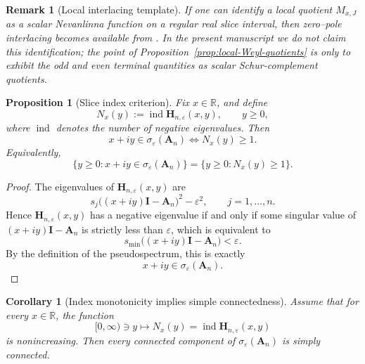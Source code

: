 \documentclass[11pt]{article}
\newtheorem{proposition}[theorem]{Proposition}
\newtheorem{corollary}[theorem]{Corollary}
\newtheorem{remark}[theorem]{Remark}
\DeclareMathOperator{\ind}{ind}
\begin{document}
\begin{remark}[Local interlacing template]\label{rem:BMT-template}
If one can identify a local quotient \(M_{x,J}\) as a scalar Nevanlinna function on a regular real
slice interval, then zero--pole interlacing becomes available from
\cite[Corollary~3.5]{BehrndtMowsTrunk2011}. In the present manuscript we do not claim this
identification; the point of Proposition~\ref{prop:local-Weyl-quotients} is only to exhibit the
odd and even terminal quantities as scalar Schur-complement quotients.
\end{remark}

\begin{proposition}[Slice index criterion]\label{prop:slice-index-criterion}
Fix \(x\in\mathbb R\), and define
\[
N_x(y):=\ind \mathbf{H}_{n,\varepsilon}(x,y),
\qquad y\ge 0,
\]
where \(\ind\) denotes the number of negative eigenvalues.
Then
\[
x+iy\in \sigma_\varepsilon(\mathbf A_n)
\iff
N_x(y)\ge 1.
\]
Equivalently,
\[
\{y\ge 0:x+iy\in \sigma_\varepsilon(\mathbf A_n)\}
=
\{y\ge 0:N_x(y)\ge 1\}.
\]
\end{proposition}

\begin{proof}
The eigenvalues of \(\mathbf H_{n,\varepsilon}(x,y)\) are
\[
s_j\bigl((x+iy)\mathbf I-\mathbf A_n\bigr)^2-\varepsilon^2,
\qquad j=1,\dots,n.
\]
Hence \(\mathbf H_{n,\varepsilon}(x,y)\) has a negative eigenvalue if and only if some singular value
of \((x+iy)\mathbf I-\mathbf A_n\) is strictly less than \(\varepsilon\), which is equivalent to
\[
s_{\min}\bigl((x+iy)\mathbf I-\mathbf A_n\bigr)<\varepsilon.
\]
By the definition of the pseudospectrum, this is exactly
\[
x+iy\in \sigma_\varepsilon(\mathbf A_n).
\]
\end{proof}

\begin{corollary}[Index monotonicity implies simple connectedness]\label{cor:index-monotone-implies-simple}
Assume that for every \(x\in\mathbb R\), the function
\[
[0,\infty)\ni y\longmapsto N_x(y)=\ind \mathbf H_{n,\varepsilon}(x,y)
\]
is nonincreasing. Then every connected component of \(\sigma_\varepsilon(\mathbf A_n)\) is simply connected.
\end{corollary}
\end{document}
